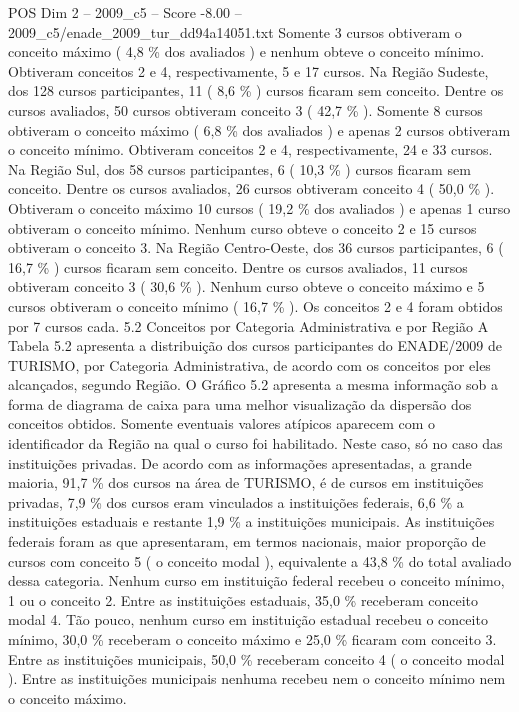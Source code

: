 \begin{textsample}{POS Dim 2 – 2009\_c5 – Score -8.00 – 2009\_c5/enade\_2009\_tur\_dd94a14051.txt}
Somente 3 cursos obtiveram o conceito máximo ( 4,8 \% dos avaliados ) e nenhum obteve o conceito mínimo.
Obtiveram conceitos 2 e 4, respectivamente, 5 e 17 cursos.
Na Região Sudeste, dos 128 cursos participantes, 11 ( 8,6 \% ) cursos ficaram sem conceito.
Dentre os cursos avaliados, 50 cursos obtiveram conceito 3 ( 42,7 \% ).
Somente 8 cursos obtiveram o conceito máximo ( 6,8 \% dos avaliados ) e apenas 2 cursos obtiveram o conceito mínimo.
Obtiveram conceitos 2 e 4, respectivamente, 24 e 33 cursos.
Na Região Sul, dos 58 cursos participantes, 6 ( 10,3 \% ) cursos ficaram sem conceito.
Dentre os cursos avaliados, 26 cursos obtiveram conceito 4 ( 50,0 \% ).
Obtiveram o conceito máximo 10 cursos ( 19,2 \% dos avaliados ) e apenas 1 curso obtiveram o conceito mínimo.
Nenhum curso obteve o conceito 2 e 15 cursos obtiveram o conceito 3.
Na Região Centro-Oeste, dos 36 cursos participantes, 6 ( 16,7 \% ) cursos ficaram sem conceito.
Dentre os cursos avaliados, 11 cursos obtiveram conceito 3 ( 30,6 \% ).
Nenhum curso obteve o conceito máximo e 5 cursos obtiveram o conceito mínimo ( 16,7 \% ).
Os conceitos 2 e 4 foram obtidos por 7 cursos cada. 5.2 Conceitos por Categoria Administrativa e por Região A Tabela 5.2 apresenta a distribuição dos cursos participantes do ENADE/2009 de TURISMO, por Categoria Administrativa, de acordo com os conceitos por eles alcançados, segundo Região.
O Gráfico 5.2 apresenta a mesma informação sob a forma de diagrama de caixa para uma melhor visualização da dispersão dos conceitos obtidos.
Somente eventuais valores atípicos aparecem com o identificador da Região na qual o curso foi habilitado.
Neste caso, só no caso das instituições privadas.
De acordo com as informações apresentadas, a grande maioria, 91,7 \% dos cursos na área de TURISMO, é de cursos em instituições privadas, 7,9 \% dos cursos eram vinculados a instituições federais, 6,6 \% a instituições estaduais e restante 1,9 \% a instituições municipais.
As instituições federais foram as que apresentaram, em termos nacionais, maior proporção de cursos com conceito 5 ( o conceito modal ), equivalente a 43,8 \% do total avaliado dessa categoria.
Nenhum curso em instituição federal recebeu o conceito mínimo, 1 ou o conceito 2.
Entre as instituições estaduais, 35,0 \% receberam conceito modal 4.
Tão pouco, nenhum curso em instituição estadual recebeu o conceito mínimo, 30,0 \% receberam o conceito máximo e 25,0 \% ficaram com conceito 3.
Entre as instituições municipais, 50,0 \% receberam conceito 4 ( o conceito modal ).
Entre as instituições municipais nenhuma recebeu nem o conceito mínimo nem o conceito máximo.

\end{textsample}
